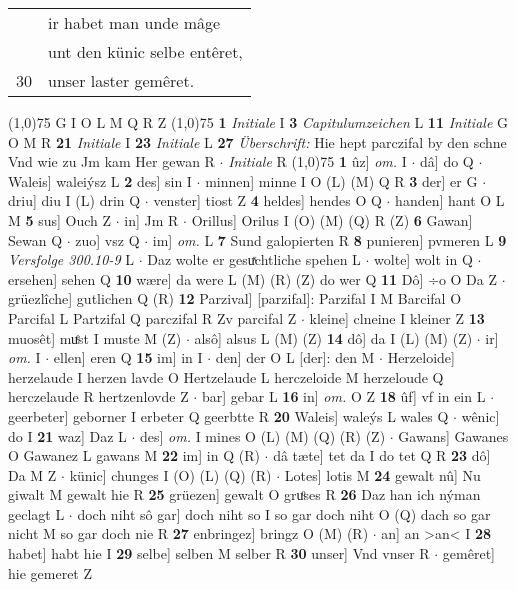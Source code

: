 \documentclass[8pt,a4paper,notitlepage]{article}
\begin{document}
\begin{table}[ht]
\begin{minipage}[t]{0.5\linewidth}
\begin{tabular}{rl}
 & ir habet man unde mâge\\ 
 & unt den künic selbe entêret,\\ 
30 & unser laster gemêret.\\ 
\end{tabular}
\scriptsize
\line(1,0){75} \newline
G I O L M Q R Z \newline
\line(1,0){75} \newline
\textbf{1} \textit{Initiale} I  \textbf{3} \textit{Capitulumzeichen} L  \textbf{11} \textit{Initiale} G O M R  \textbf{21} \textit{Initiale} I  \textbf{23} \textit{Initiale} L  \textbf{27} \textit{Überschrift:} Hie hept parczifal by den schne Vnd wie zu Jm kam Her gewan R   $\cdot$ \textit{Initiale} R  \newline
\line(1,0){75} \newline
\textbf{1} ûz] \textit{om.} I  $\cdot$ dâ] do Q  $\cdot$ Waleis] waleiýsz L \textbf{2} des] sin I  $\cdot$ minnen] minne I O (L) (M) Q R \textbf{3} der] er G  $\cdot$ driu] diu I (L) drin Q  $\cdot$ venster] tiost Z \textbf{4} heldes] hendes O Q  $\cdot$ handen] hant O L M \textbf{5} sus] Ouch Z  $\cdot$ in] Jm R  $\cdot$ Orillus] Orilus I (O) (M) (Q) R (Z) \textbf{6} Gawan] Sewan Q  $\cdot$ zuo] vsz Q  $\cdot$ im] \textit{om.} L \textbf{7} Sund galopierten R \textbf{8} punieren] pvmeren L \textbf{9} \textit{Versfolge 300.10-9} L   $\cdot$ Daz wolte er gesuͯchtliche spehen L  $\cdot$ wolte] wolt in Q  $\cdot$ ersehen] sehen Q \textbf{10} wære] da were L (M) (R) (Z) do wer Q \textbf{11} Dô] ÷o O Da Z  $\cdot$ grüezlîche] gutlichen Q (R) \textbf{12} Parzival] [parzifal]: Parzifal I M Barcifal O Parcifal L Partzifal Q parczifal R Zv parcifal Z  $\cdot$ kleine] clneine I kleiner Z \textbf{13} muosêt] muͤst I muste M (Z)  $\cdot$ alsô] alsus L (M) (Z) \textbf{14} dô] da I (L) (M) (Z)  $\cdot$ ir] \textit{om.} I  $\cdot$ ellen] eren Q \textbf{15} im] in I  $\cdot$ den] der O L [der]: den M  $\cdot$ Herzeloide] herzelaude I herzen lavde O Hertzelaude L herczeloide M herzeloude Q herczelaude R hertzenlovde Z  $\cdot$ bar] gebar L \textbf{16} in] \textit{om.} O Z \textbf{18} ûf] vf in ein L  $\cdot$ geerbeter] geborner I erbeter Q geerbtte R \textbf{20} Waleis] waleýs L wales Q  $\cdot$ wênic] do I \textbf{21} waz] Daz L  $\cdot$ des] \textit{om.} I mines O (L) (M) (Q) (R) (Z)  $\cdot$ Gawans] Gawanes O Gawanez L gawans M \textbf{22} im] in Q (R)  $\cdot$ dâ tæte] tet da I do tet Q R \textbf{23} dô] Da M Z  $\cdot$ künic] chunges I (O) (L) (Q) (R)  $\cdot$ Lotes] lotis M \textbf{24} gewalt nû] Nu giwalt M gewalt hie R \textbf{25} grüezen] gewalt O gruͦses R \textbf{26} Daz han ich nýman geclagt L  $\cdot$ doch niht sô gar] doch niht so I so gar doch niht O (Q) dach so gar nicht M so gar doch nie R \textbf{27} enbringez] bringz O (M) (R)  $\cdot$ an] an >an< I \textbf{28} habet] habt hie I \textbf{29} selbe] selben M selber R \textbf{30} unser] Vnd vnser R  $\cdot$ gemêret] hie gemeret Z \newline

\end{minipage}
\end{table}
\end{document}
